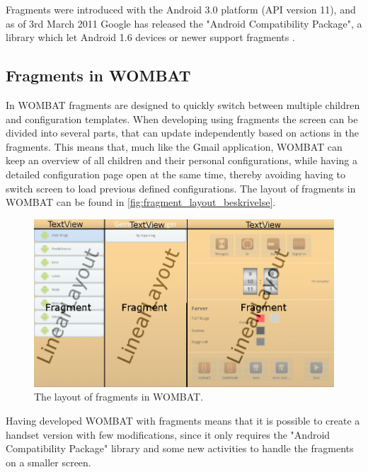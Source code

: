 Fragments were introduced with the Android 3.0 platform (API version 11), and as of 3rd March 2011 Google has released the "Android Compatibility Package", a library which let Android 1.6 devices or newer support fragments \cite{web:android:fragments:support}.
 
\subsection{Fragments in WOMBAT}
In WOMBAT fragments are designed to quickly switch between multiple children and configuration templates. When developing using fragments the screen can be divided into several parts, that can update independently based on actions in the fragments.
This means that, much like the Gmail application, WOMBAT can keep an overview of all children and their personal configurations, while having a detailed configuration page open at the same time, thereby avoiding having to switch screen to load previous defined configurations. The layout of fragments in WOMBAT can be found in \autoref{fig:fragment_layout_beskrivelse}.\\

\begin{figure}[H]
	\centering
		\includegraphics{Images/Implementation/fragment_layout_beskrivelse.png}
	\caption{The layout of fragments in WOMBAT.}
	\label{fig:fragment_layout_beskrivelse}
\end{figure}

Having developed WOMBAT with fragments means that it is possible to create a handset version with few modifications, since it only requires the "Android Compatibility Package" library and some new activities to handle the fragments on a smaller screen.